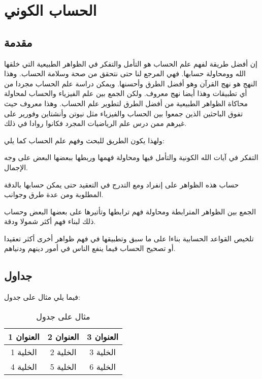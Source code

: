 \chapter{الحساب الكوني}


\section{مقدمة}

إن أفضل طريقة لفهم علم الحساب هو التأمل والتفكر في الظواهر الطبيعية التي خلقها الله وومحاولة حسابها. فهي المرجع لنا حتى نتحقق من صحة وسلامة الحساب. وهذا النهج هو نهج القرآن وهو أفضل الطرق وأحسنها. ويمكن دراسة علم الحساب مجردا من أي تطبيقات وهذا أيضا نهج معروف. ولكن الجمع بين علم الفيزياء والحساب لمحاولة محاكاة الظواهر الطبيعية من أفضل الطرق لتطوير علم الحساب. وهذا معروف حيث تفوق الباحثين الذين جمعوا بين الحساب والفيزياء مثل نيوتن وأنشتاين وفورير على غيرهم ممن درس علم الرياضيات المجرد فكانوا روادا في ذلك.

ولهذا يكون الطريق للبحث وفهم علم الحساب كما يلي:
\begin{compactenum}
  \item التفكر في آيات الله الكونية والتأمل فيها ومحاولة فهمها وربطها ببعضها البعض على وجه الإجمال.
  \item حساب هذه الظواهر على إنفراد ومع التدرج في التعقيد حتى يمكن حسابها بالدقة المطلوبة ومن عدة طرق وجوانب.
  \item الجمع بين الظواهر المترابطة ومحاولة فهم ترابطها وتأتيرها على بعضها البعض وحساب ذلك لبناء فهم أكثر شمولا ودقة.
  \item تلخيص القواعد الحسابية بناءا على ما سبق وتطبيقها في فهم ظواهر أخرى أكثر تعقيدا أو تصحيح الحساب فيما ينفع الناس في أمور دينهم ودنياهم.
\end{compactenum}



\section{جداول}
فيما يلي مثال على جدول:

\begin{table}[h]
  \centering
  \begin{tabular}{|c|c|c|}
    \hline
    العنوان 1 & العنوان 2 & العنوان 3 \\
    \hline
    الخلية 1  & الخلية 2  & الخلية 3  \\
    \hline
    الخلية 4  & الخلية 5  & الخلية 6  \\
    \hline
  \end{tabular}
  \caption{مثال على جدول}
\end{table}

